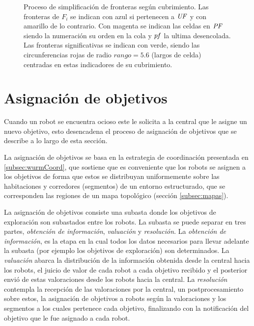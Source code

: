 \begin{figure}[H]
  \caption[Proceso de simplificación de fronteras según cubrimiento.]{Proceso
    de simplificación de fronteras según cubrimiento.  Las fronteras de
    $F_i$ se indican con azul si pertenecen a $\mathit{UF}$ y con amarillo de lo
    contrario. Con magenta se indican las celdas en $\mathit{PF}$ siendo la
  numeración su orden en la cola y $\mathit{pf}$ la ultima desencolada. Las fronteras significativas se indican con
verde, siendo las circunferencias rojas de radio $rango=5.6$ (largos de celda) centradas en estas indicadores de su cubrimiento.}\label{fig:ejemploFSCub}

\end{figure}


\section{Asignación de objetivos}\label{sec:asigTar}

Cuando un robot se encuentra ocioso este le solicita a la central que le asigne
un nuevo objetivo, esto desencadena el proceso de asignación de
objetivos que se describe a lo largo de esta sección.

La asignación de objetivos se basa en la estrategia de coordinación presentada
en \ref{subsec:wurmCoord}, que sostiene que es conveniente que los robots se
asignen a los objetivos de forma que estos se distribuyan uniformemente sobre
las habitaciones y corredores (segmentos) de un entorno estructurado, que se
corresponden las regiones de un mapa topológico (sección \ref{subsec:mapas}).

La asignación de objetivos consiste una subasta donde los objetivos de
exploración son subastados entre los robots. La subasta se puede separar en
tres partes, \emph{obtención de información}, \emph{valuación} y
\emph{resolución}. La \emph{obtención de información}, es la etapa en la cual
todos los datos necesarios para llevar adelante la subasta (por ejemplo los objetivos de
exploración) son determinados. La \emph{valuación} abarca la distribución de
la información obtenida desde la central hacia los robots, el juicio de valor
de cada robot a cada objetivo recibido y el posterior envió de estas
valoraciones desde los robots hacia la central. La \emph{resolución} contempla
la recepción de las valoraciones por la central, un postprocesamiento sobre
estos, la asignación de objetivos a robots según la valoraciones y los
segmentos a los cuales pertenece cada objetivo, finalizando con la notificación
del objetivo que le fue asignado a cada robot.

